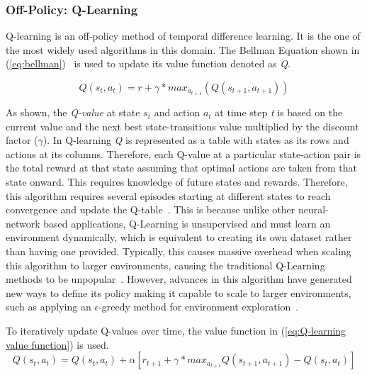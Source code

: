 \documentclass[12pt,american]{report}
\begin{document}
        
\subsubsection{Off-Policy: Q-Learning}
        Q-learning is an off-policy method of temporal difference learning. It is the one of the most widely used algorithms in this domain. The Bellman Equation shown in (\ref{eq:bellman})~\cite{matiisen_2015} is used to update its value function denoted as \textit{Q}.
        
        \begin{equation}
            \label{eq:bellman}
            Q(s_{t},a_{t}) = r + \gamma*max_{a_{t+1} }(Q(s_{t+1},a_{t+1}))
        \end{equation}
        
        As shown, the \textit{Q-value} at state \textit{$s_t$} and action \textit{$a_t$} at time step \textit{t} is based on the current value and the next best state-transitions value multiplied by the discount factor ($\gamma$). In Q-learning \textit{Q} is represented as a table with states as its rows and actions at its columns.  Therefore, each Q-value at a particular state-action pair is the total reward at that state assuming that optimal actions are taken from that state onward.  This requires knowledge of future states and rewards.  Therefore, this algorithm requires several episodes starting at different states to reach convergence and update the Q-table~\cite{Watkins:1992}. This is because unlike other neural-network based applications, Q-Learning is unsupervised and must learn an environment dynamically, which is equivalent to creating its own dataset rather than having one provided. Typically, this causes massive overhead when scaling this algorithm to larger environments, causing the traditional Q-Learning methods to be unpopular~\cite{peng2015mobile}.  However, advances in this algorithm have generated new ways to define its policy making it capable to scale to larger environments, such as applying an $\epsilon$-greedy method for environment exploration~\cite{Greedy}. 

To iteratively update Q-values over time, the value function in (\ref{eq:Q-learning value function}) is used. 
        \begin{equation}
            \label{eq:Q-learning value function}
            Q(s_{t},a_{t}) = Q(s_{t},a_{t}) + \alpha[r_{t+1} + \gamma*max_{a_{t+1} }Q(s_{t+1},a_{t+1})-Q(s_{t},a_{t})]
        \end{equation}
        
\end{document}
